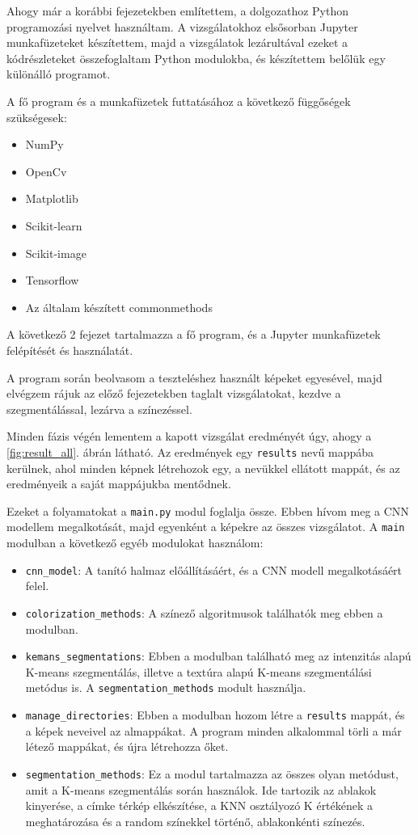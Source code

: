 
Ahogy már a korábbi fejezetekben említettem, a dolgozathoz Python programozási nyelvet használtam. A vizsgálatokhoz elsősorban Jupyter munkafüzeteket készítettem, majd a vizsgálatok lezárultával ezeket a kódrészleteket összefoglaltam Python modulokba, és készítettem belőlük egy különálló programot.

A fő program és a munkafüzetek futtatásához a következő függőségek szükségesek:
\begin{itemize}
\item NumPy
\item OpenCv
\item Matplotlib
\item Scikit-learn
\item Scikit-image
\item Tensorflow
\item Az általam készített commonmethods
\end{itemize}

A következő 2 fejezet tartalmazza a fő program, és a Jupyter munkafüzetek felépítését és használatát.

A program során beolvasom a teszteléshez használt képeket egyesével, majd elvégzem rájuk az előző fejezetekben taglalt vizsgálatokat, kezdve a szegmentálással, lezárva a színezéssel.

Minden fázis végén lementem a kapott vizsgálat eredményét úgy, ahogy a \ref{fig:result_all}. ábrán látható. Az eredmények egy \texttt{results} nevű mappába kerülnek, ahol minden képnek létrehozok egy, a nevükkel ellátott mappát, és az eredményeik a saját mappájukba mentődnek.

Ezeket a folyamatokat a \texttt{main.py} modul foglalja össze. Ebben hívom meg a CNN modellem megalkotását, majd egyenként a képekre az összes vizsgálatot. A \texttt{main} modulban a következő egyéb modulokat használom:
\begin{itemize}
\item \texttt{cnn\_model}: A tanító halmaz előállításáért, és a CNN modell megalkotásáért felel.
\item \texttt{colorization\_methods}: A színező algoritmusok találhatók meg ebben a modulban.
\item \texttt{kemans\_segmentations}: Ebben a modulban található meg az intenzitás alapú K-means szegmentálás, illetve a textúra alapú K-means szegmentálási metódus is. A \texttt{segmentation\_methods} modult használja.
\item \texttt{manage\_directories}: Ebben a modulban hozom létre a \texttt{results} mappát, és a képek neveivel az almappákat. A program minden alkalommal törli a már létező mappákat, és újra létrehozza őket.
\item \texttt{segmentation\_methods}: Ez a modul tartalmazza az összes olyan metódust, amit a K-means szegmentálás során használok. Ide tartozik az ablakok kinyerése, a címke térkép elkészítése, a KNN osztályozó K értékének a meghatározása és a random színekkel történő, ablakonkénti színezés.
\end{itemize}

